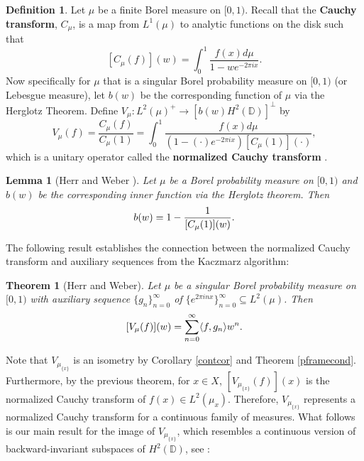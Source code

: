 \documentclass[11pt]{amsart}
\newtheorem*{thm*}{Theorem}
\newtheorem*{lem*}{Lemma}
\theoremstyle{definition}
\newtheorem{defn}[thm]{Definition}
\numberwithin{equation}{section}
\begin{document}
\begin{defn}
Let $\mu$ be a finite Borel measure on $[0,1)$. Recall that the \textbf{Cauchy transform}, $C_{\mu}$, is a map from $L^{1}(\mu)$ to analytic functions on the disk such that
$$[C_{\mu}(f)](w)=\int_{0}^{1}\frac{f(x)d\mu}{1-we^{-2\pi i x}}.$$
Now specifically for $\mu$ that is a singular Borel probability measure on $[0,1)$ (or Lebesgue measure), let $b(w)$ be the corresponding function of $\mu$ via the Herglotz Theorem.
Define $V_{\mu}: L^{2}(\mu)^{+}\to [b(w)H^{2}(\mathbb{D})]^{\perp}$
by \begin{equation}V_{\mu}(f)=\frac{C_{\mu}(f)}{C_{\mu}(1)} = \int_{0}^{1} \dfrac{f(x) d\mu}{(1 - (\cdot)e^{-2\pi i x}) [C_{\mu}(1)](\cdot)},\end{equation}
which is a unitary operator called the \textbf{normalized Cauchy transform} \cite{Sarason1994Sub-Hardy, Clark1972One}.
\end{defn}

\begin{lem*}[Herr and Weber \cite{Herr2017Fourier}]
Let $\mu$ be a Borel probability measure on $[0,1)$ and $b(w)$ be the corresponding inner function via the Herglotz theorem. Then
\begin{equation}{\label{inner}}
b(w)=1-\frac{1}{[C_{\mu}(1)](w)}.
\end{equation}
\end{lem*}

The following result establishes the connection between the normalized Cauchy transform and auxiliary sequences from the Kaczmarz algorithm:

\begin{thm*}[Herr and Weber]
Let $\mu$ be a singular Borel probability measure on $[0,1)$ with auxiliary sequence $\{g_{n}\}_{n=0}^{\infty}$ of $\{e^{2\pi i nx}\}_{n=0}^{\infty}\subseteq L^{2}(\mu)$.
Then \begin{equation}{\label{NCT}}[V_{\mu}(f)](w)=\sum_{n=0}^{\infty}\langle f,g_{n}\rangle w^{n}.\end{equation}
\end{thm*}

Note that $V_{\mu_{\{x\}}}$ is an isometry by Corollary \ref{contcor} and Theorem \ref{pframecond}. Furthermore, by the previous theorem, for $x\in X$, $[V_{\mu_{\{x\}}}(f)](x)$ is the normalized Cauchy transform of $f(x)\in L^{2}(\mu_{x})$. Therefore, $V_{\mu_{\{x\}}}$ represents a normalized Cauchy transform for a continuous family of measures. What follows is our main result for the image of $V_{\mu_{\{x\}}}$, which resembles a continuous version of backward-invariant subspaces of $H^{2}(\mathbb{D})$, see \cite{Beurling1948Two}:
\end{document}
